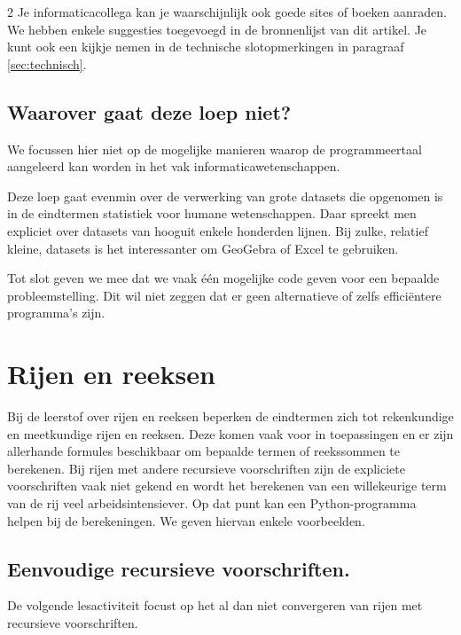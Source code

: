 \begin{multicols}{2}
   Je informaticacollega kan je waarschijnlijk ook goede sites of boeken aanraden. We hebben enkele suggesties toegevoegd in de bronnenlijst van dit artikel. Je kunt ook een kijkje nemen in de technische slotopmerkingen in paragraaf \ref{sec:technisch}.
	
    \subsection{Waarover gaat deze loep niet?} \label{sec:watniet}
    
    We focussen hier niet op de mogelijke manieren waarop de programmeertaal aangeleerd kan worden in het vak informaticawetenschappen.

    Deze loep gaat evenmin over de verwerking van grote datasets die opgenomen is in de eindtermen statistiek voor humane wetenschappen. Daar spreekt men expliciet over datasets van hooguit enkele honderden lijnen. Bij zulke, relatief kleine, datasets is het interessanter om GeoGebra of Excel te gebruiken.

    Tot slot geven we mee dat we vaak \'e\'en mogelijke code geven voor een bepaalde probleemstelling. Dit wil niet zeggen dat er geen alternatieve of zelfs effici\"entere programma's zijn. 
 
	
	\section{Rijen en reeksen}
        Bij de leerstof over rijen en reeksen beperken de eindtermen zich tot rekenkundige en meetkundige rijen en reeksen. Deze komen vaak voor in toepassingen en er zijn allerhande formules beschikbaar om bepaalde termen of reekssommen te berekenen. Bij rijen met andere recursieve voorschriften zijn de expliciete voorschriften vaak niet gekend en wordt het berekenen van een willekeurige term van de rij veel arbeidsintensiever. Op dat punt kan een Python-programma helpen bij de berekeningen. We geven hiervan enkele voorbeelden.

        \subsection{Eenvoudige recursieve voorschriften.}
        De volgende lesactiviteit focust op het al dan niet convergeren van rijen met recursieve voorschriften. 
        \end{multicols}
